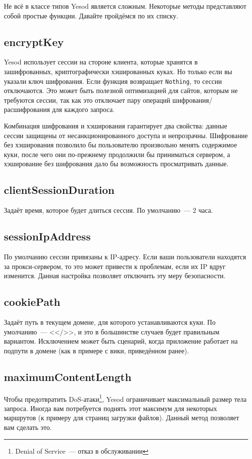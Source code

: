 Не всё в классе типов Yesod является сложным. Некоторые методы представляют
собой простые функции. Давайте пройдёмся по их списку.

\subsection {encryptKey}

Yesod использует сессии на стороне клиента, которые хранятся в зашифрованных,
криптографически хэшированных куках. Но только если вы указали ключ шифрования.
Если функция возвращает \lstinline!Nothing!, то сессии отключаются. Это может
быть полезной оптимизацией для сайтов, которым не требуются сессии, так как это
отключает пару операций шифрования/расшифрования для каждого запроса.

\begin{remark}
    Комбинация шифрования и хэширования гарантирует два свойства: данные сессии
    защищены от несанкционированного доступа и непрозрачны. Шифрование без
    хэширования позволило бы пользователю произвольно менять содержимое куки,
    после чего они по-прежнему продолжили бы приниматься сервером, а
    хэширование без шифрования дало бы возможность просматривать данные.
\end{remark}

\subsection {clientSessionDuration}
Задаёт время, которое будет длиться сессия. По умолчанию~--- 2 часа.

\subsection {sessionIpAddress}
По умолчанию сессии привязаны к IP-адресу. Если ваши пользователи находятся за
прокси-сервером, то это может привести к проблемам, если их IP вдруг изменится.
Данная настройка позволяет отключить эту меру безопасности.

\subsection {cookiePath}
Задаёт путь в текущем домене, для которого устанавливаются куки. По
умолчанию~--- <</>>, и это в большинстве случаев будет правильным вариантом.
Исключением может быть сценарий, когда приложение работает на подпути в домене
(как в примере с вики, приведённом ранее).

\subsection {maximumContentLength}
Чтобы предотвратить DoS-атаки\footnote{Denial of Service~--- отказ в
    обслуживании}, Yesod ограничивает максимальный размер тела запроса.  Иногда
вам потребуется поднять этот максимум для некоторых маршрутов (к примеру для
страниц загрузки файлов). Данный метод позволяет вам сделать это.

